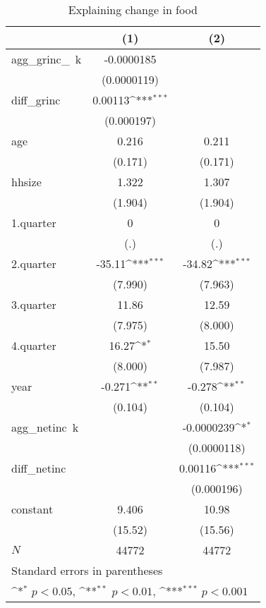 \begin{table}[htbp]\centering
\def\sym#1{\ifmmode^{#1}\else\(^{#1}\)\fi}
\caption{\label{food\_deltainc} Explaining change in food}
\begin{tabular}{l*{2}{c}}
\hline\hline
            &\multicolumn{1}{c}{(1)}         &\multicolumn{1}{c}{(2)}         \\
\hline
agg\_grinc\_~k&  -0.0000185         &                     \\
            & (0.0000119)         &                     \\
diff\_grinc  &     0.00113\sym{***}&                     \\
            &  (0.000197)         &                     \\
age         &       0.216         &       0.211         \\
            &     (0.171)         &     (0.171)         \\
hhsize      &       1.322         &       1.307         \\
            &     (1.904)         &     (1.904)         \\
1.quarter   &           0         &           0         \\
            &         (.)         &         (.)         \\
2.quarter   &      -35.11\sym{***}&      -34.82\sym{***}\\
            &     (7.990)         &     (7.963)         \\
3.quarter   &       11.86         &       12.59         \\
            &     (7.975)         &     (8.000)         \\
4.quarter   &       16.27\sym{*}  &       15.50         \\
            &     (8.000)         &     (7.987)         \\
year        &      -0.271\sym{**} &      -0.278\sym{**} \\
            &     (0.104)         &     (0.104)         \\
agg\_netinc~k&                     &  -0.0000239\sym{*}  \\
            &                     & (0.0000118)         \\
diff\_netinc &                     &     0.00116\sym{***}\\
            &                     &  (0.000196)         \\
constant    &       9.406         &       10.98         \\
            &     (15.52)         &     (15.56)         \\
\hline
\(N\)       &       44772         &       44772         \\
\hline\hline
\multicolumn{3}{l}{\footnotesize Standard errors in parentheses}\\
\multicolumn{3}{l}{\footnotesize \sym{*} \(p<0.05\), \sym{**} \(p<0.01\), \sym{***} \(p<0.001\)}\\
\end{tabular}
\end{table}
